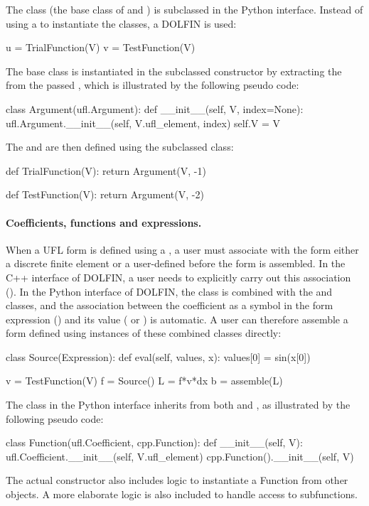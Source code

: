 The  class (the base class of\break {}
and ) is subclassed in the Python interface. Instead
of using a  to instantiate the classes, a DOLFIN
 is used:
\begin{python}
u = TrialFunction(V)
v = TestFunction(V)
\end{python}
The  base class is instantiated in the subclassed
constructor by extracting the\break {} from the passed
, which is illustrated by the following pseudo
code:
\begin{python}
class Argument(ufl.Argument):
    def __init__(self, V, index=None):
        ufl.Argument.__init__(self, V.ufl_element, index)
        self.V = V
\end{python}
The  and  are then defined using the
subclassed  class:
\begin{python}
def TrialFunction(V):
    return Argument(V, -1)

def TestFunction(V):
    return Argument(V, -2)
\end{python}

\enlargethispage{12pt}

\paragraph{Coefficients, functions and expressions.}

When a UFL form is defined using a , a user must
associate with the form either a discrete finite element
 or a user-defined  before the form is
assembled. In the C++ interface of DOLFIN, a user needs to explicitly
carry out this association (). In the Python interface of
DOLFIN, the  class is combined with the \dolfin
{} and  classes, and the association
between the coefficient as a symbol in the form expression
() and its value ( or )
is automatic. A user can therefore assemble a form defined using
instances of these combined classes directly:
\begin{python}
class Source(Expression):
    def eval(self, values, x):
        values[0] = sin(x[0])

v = TestFunction(V)
f = Source()
L = f*v*dx
b = assemble(L)
\end{python}
The  class in the Python interface inherits from both
 and , as illustrated by the
following pseudo code:
\begin{python}
class Function(ufl.Coefficient, cpp.Function):
    def __init__(self, V):
        ufl.Coefficient.__init__(self, V.ufl_element)
        cpp.Function().__init__(self, V)
\end{python}
The actual constructor also includes logic to instantiate a Function
from other objects. A more elaborate logic is also included to handle
access to subfunctions.

